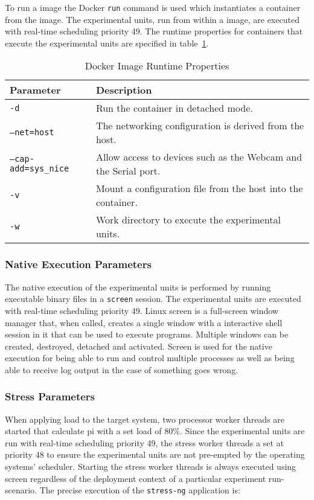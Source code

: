 To run a image the Docker \texttt{run} command is used which instantiates a container from the image. The experimental units, run from within a image, are executed with real-time scheduling priority 49. The runtime properties for containers that execute the experimental units are specified in table~\ref{docker-parameters}.

\begin{table}[]
\begin{tabular}{|l|p{10cm}|}
\hline
\textbf{Parameter}  		 & \textbf{Description}                                            \\ \hline
\texttt{-d}                  & Run the container in detached mode.                             \\ \hline
\texttt{--net=host}          & The networking configuration is derived from the host.          \\ \hline
\texttt{--cap-add=sys\_nice} & Allow access to devices such as the Webcam and the Serial port. \\ \hline
\texttt{-v}					 & Mount a configuration file from the host into the container.	   \\ \hline
\texttt{-w}                  & Work directory to execute the experimental units.               \\ \hline
\end{tabular}
\centering
\caption{Docker Image Runtime Properties}
\label{docker-parameters}
\end{table}


\subsubsection{Native Execution Parameters} 
The native execution of the experimental units is performed by running executable binary files in a \texttt{screen} \cite{screen} session. The experimental units are executed with real-time scheduling priority 49. Linux screen is a full-screen window manager that, when called, creates a single window with a interactive shell session in it that can be used to execute programs. Multiple windows can be created, destroyed, detached and activated. Screen is used for the native execution for being able to run and control multiple processes as well as being able to receive log output in the case of something goes wrong. 


\subsubsection{Stress Parameters}
When applying load to the target system, two processor worker threads are started that calculate pi with a set load of 80\%. Since the experimental units are run with real-time scheduling priority 49, the stress worker threads a set at priority 48 to ensure the experimental units are not pre-empted by the operating systems' scheduler. Starting the stress worker threads is always executed using screen regardless of the deployment context of a particular experiment run-scenario. The precise execution of the \texttt{stress-ng} application is: \\

